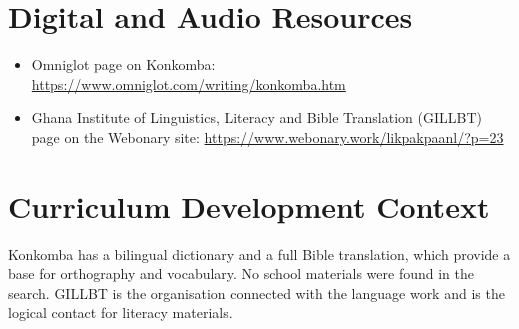 \documentclass[12pt]{article}
\begin{document}
\section{Digital and Audio Resources}
\begin{itemize}
\item Omniglot page on Konkomba: \url{https://www.omniglot.com/writing/konkomba.htm}
\item Ghana Institute of Linguistics, Literacy and Bible Translation (GILLBT) page on the Webonary site: \url{https://www.webonary.work/likpakpaanl/?p=23}
\end{itemize}

\section{Curriculum Development Context}
Konkomba has a bilingual dictionary and a full Bible translation, which provide a base for orthography and vocabulary. No school materials were found in the search. GILLBT is the organisation connected with the language work and is the logical contact for literacy materials.
\end{document}
